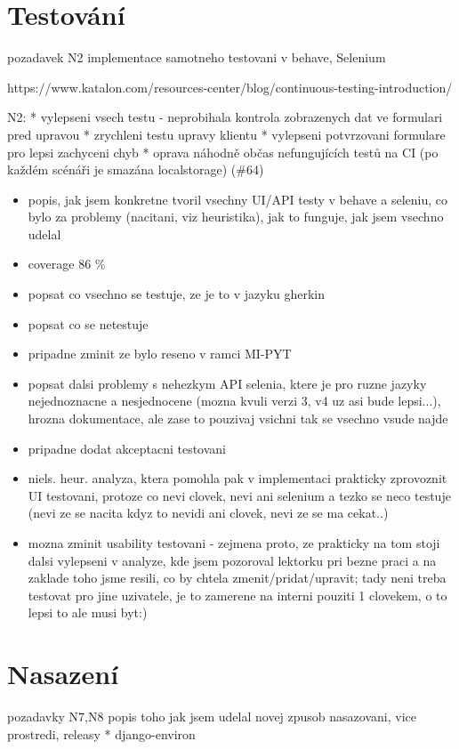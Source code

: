 \chapter{Testování}\label{chap:testovani}
pozadavek N2
implementace samotneho testovani v behave, Selenium

https://www.katalon.com/resources-center/blog/continuous-testing-introduction/

N2: 
* vylepseni vsech testu - neprobihala kontrola zobrazenych dat ve formulari pred upravou
* zrychleni testu upravy klientu
* vylepseni potvrzovani formulare pro lepsi zachyceni chyb
* oprava náhodně občas nefungujících testů na CI (po každém scénáři je smazána localstorage) (\#64)

\begin{itemize}
\item popis, jak jsem konkretne tvoril vsechny UI/API testy v behave a seleniu, co bylo za problemy (nacitani, viz heuristika), jak to funguje, jak jsem vsechno udelal
\item coverage 86 \%
\item popsat co vsechno se testuje, ze je to v jazyku gherkin
\item popsat co se netestuje
\item pripadne zminit ze bylo reseno v ramci MI-PYT
\item popsat dalsi problemy s nehezkym API selenia, ktere je pro ruzne jazyky nejednoznacne a nesjednocene (mozna kvuli verzi 3, v4 uz asi bude lepsi...), hrozna dokumentace, ale zase to pouzivaj vsichni tak se vsechno vsude najde
\item pripadne dodat akceptacni testovani
\item niels. heur. analyza, ktera pomohla pak v implementaci prakticky zprovoznit UI testovani, protoze co nevi clovek, nevi ani selenium a tezko se neco testuje (nevi ze se nacita kdyz to nevidi ani clovek, nevi ze se ma cekat..)
\item mozna zminit usability testovani - zejmena proto, ze prakticky na tom stoji dalsi vylepseni v analyze, kde jsem pozoroval lektorku pri bezne praci a na zaklade toho jsme resili, co by chtela zmenit/pridat/upravit; tady neni treba testovat pro jine uzivatele, je to zamerene na interni pouziti 1 clovekem, o to lepsi to ale musi byt:)
\end{itemize}


\chapter{Nasazení}\label{chap:nasazeni}
pozadavky N7,N8
popis toho jak jsem udelal novej zpusob nasazovani, vice prostredi, releasy
* django-environ


